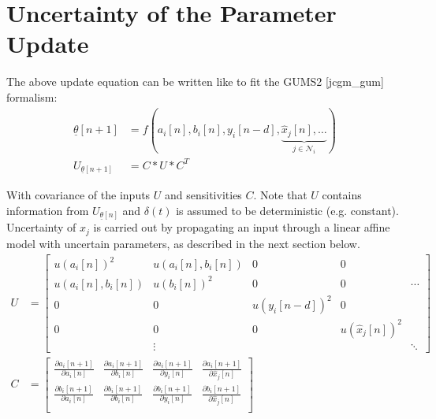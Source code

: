 \documentclass[10pt,a4paper,onecolumn]{article}
\renewcommand{\vec}[1]{\underline{#1}}
\begin{document}
    \section{Uncertainty of the Parameter Update}
    The above update equation can be written like to fit the GUMS2 [jcgm\_gum] formalism:
    \begin{align}
        \vec{\theta}[n+1] &= f(a_i[n], b_i[n], y_i[n-d], \underbrace{\hat{x}_j[n], \dots}_{j \in \mathcal{N}_i}) \\
        U_{\vec{\theta}[n+1]} &= C * U * C^T
    \end{align}
    
    With covariance of the inputs $U$ and sensitivities $C$. Note that $U$ contains information from $U_{\vec{\theta}[n]}$ and $\delta(t)$ is assumed to be deterministic (e.g. constant). Uncertainty of $\hat{x}_j$ is carried out by propagating an input through a linear affine model with uncertain parameters, as described in the next section below. 
    \begin{align}
        U &= 
        \begin{bmatrix}
            u(a_i[n])^2 & u(a_i[n], b_i[n]) & 0 & 0 & \\
            u(a_i[n], b_i[n]) & u(b_i[n])^2 & 0 & 0 & \cdots \\
            0 & 0 & u(y_i[n-d])^2 & 0 & \\
            0 & 0 & 0 & u(\hat{x}_j[n])^2 & \\
            & \vdots & & & \ddots
        \end{bmatrix} \\
        C &=
        \begin{bmatrix}
            \frac{\partial a_i[n+1]}{\partial a_i[n]} & \frac{\partial a_i[n+1]}{\partial b_i[n]} & \frac{\partial a_i[n+1]}{\partial y_i[n]} & \frac{\partial a_i[n+1]}{\partial \hat{x}_j[n]} \\
            \frac{\partial b_i[n+1]}{\partial a_i[n]} & \frac{\partial b_i[n+1]}{\partial b_i[n]} & \frac{\partial b_i[n+1]}{\partial y_i[n]} & \frac{\partial b_i[n+1]}{\partial \hat{x}_j[n]} \\
        \end{bmatrix}
    \end{align}
    
\end{document}
